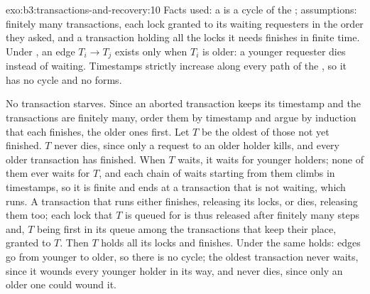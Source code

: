 \begin{solution}{exo:b3:transactions-and-recovery:10}
Facts used: a  is a cycle of the ; assumptions: finitely many transactions, each lock granted to its waiting requesters in the order they asked, and a transaction holding all the locks it needs finishes in finite time. Under , an edge $T_i \to T_j$ exists only when $T_i$ is older: a younger requester dies instead of waiting. Timestamps strictly increase along every path of the , so it has no cycle and no  forms.

No transaction starves. Since an aborted transaction keeps its timestamp and the transactions are finitely many, order them by timestamp and argue by induction that each finishes, the older ones first. Let $T$ be the oldest of those not yet finished. $T$ never dies, since only a request to an older holder kills, and every older transaction has finished. When $T$ waits, it waits for younger holders; none of them ever waits for $T$, and each chain of waits starting from them climbs in timestamps, so it is finite and ends at a transaction that is not waiting, which runs. A transaction that runs either finishes, releasing its locks, or dies, releasing them too; each lock that $T$ is queued for is thus released after finitely many steps and, $T$ being first in its queue among the transactions that keep their place, granted to $T$. Then $T$ holds all its locks and finishes. Under  the same holds: edges go from younger to older, so there is no cycle; the oldest transaction never waits, since it wounds every younger holder in its way, and never dies, since only an older one could wound it.
\end{solution}

